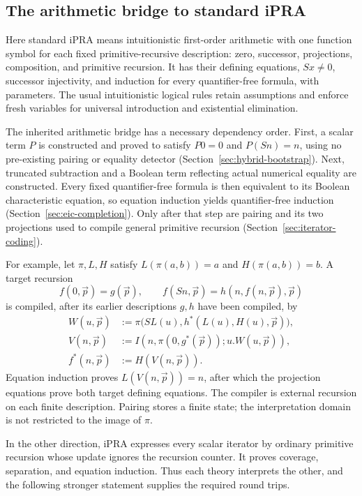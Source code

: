 \subsection{The arithmetic bridge to standard iPRA}

Here standard iPRA means intuitionistic first-order arithmetic with one
function symbol for each fixed primitive-recursive description: zero,
successor, projections, composition, and primitive recursion. It has their
defining equations, $Sx\ne0$, successor injectivity, and induction for every
quantifier-free formula, with parameters. The usual intuitionistic logical
rules retain assumptions and enforce fresh variables for universal
introduction and existential elimination.

The inherited arithmetic bridge has a necessary dependency order.
First, a scalar term $P$ is constructed and proved to satisfy
$P0=0$ and $P(Sn)=n$, using no pre-existing pairing or equality detector
(Section~\ref{sec:hybrid-bootstrap}). Next, truncated subtraction and a
Boolean term reflecting actual numerical equality are constructed.
Every fixed quantifier-free formula is then equivalent to its Boolean
characteristic equation, so equation induction yields quantifier-free
induction (Section~\ref{sec:eic-completion}). Only after that step are pairing
and its two projections used to compile general primitive recursion
(Section~\ref{sec:iterator-coding}).

For example, let $\pi,L,H$ satisfy
$L(\pi(a,b))=a$ and $H(\pi(a,b))=b$. A target recursion
\[
 f(0,\vec p)=g(\vec p),\qquad
 f(Sn,\vec p)=h(n,f(n,\vec p),\vec p)
\]
is compiled, after its earlier descriptions $g,h$ have been compiled, by
\[
 \begin{aligned}
 W(u,\vec p)&:=
   \pi\bigl(SL(u),h^*(L(u),H(u),\vec p)\bigr),\\
 V(n,\vec p)&:=I(n,\pi(0,g^*(\vec p));u.W(u,\vec p)),\\
 f^*(n,\vec p)&:=H(V(n,\vec p)).
 \end{aligned}
\]
Equation induction proves $L(V(n,\vec p))=n$, after which the projection
equations prove both target defining equations. The compiler is external
recursion on each finite description. Pairing stores a finite state; the
interpretation domain is not restricted to the image of $\pi$.

In the other direction, iPRA expresses every scalar iterator by ordinary
primitive recursion whose update ignores the recursion counter. It proves
coverage, separation, and equation induction. Thus each theory interprets
the other, and the following stronger statement supplies the required
round trips.

